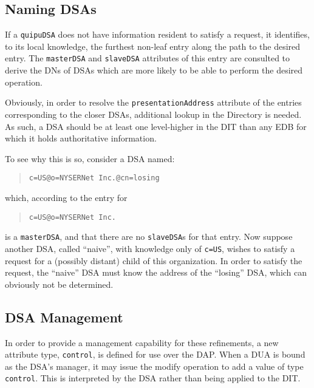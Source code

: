 \subsection	{Naming DSAs}
If a \verb"quipuDSA" does not have information resident to satisfy a request,
it identifies,
to its local knowledge,
the furthest non-leaf entry along the path to the desired entry.
The \verb"masterDSA" and \verb"slaveDSA" attributes of this entry are
consulted to derive the DNs of DSAs which are more likely to be able to
perform the desired operation.

Obviously,
in order to resolve the \verb"presentationAddress" attribute of the entries
corresponding to the closer DSAs,
additional lookup in the Directory is needed.
As such,
a DSA should be at least one level-higher in the DIT than any EDB for which it
holds authoritative information.

To see why this is so,
consider a DSA named:
\begin{quote}\small\begin{verbatim}
c=US@o=NYSERNet Inc.@cn=losing
\end{verbatim}\end{quote}
which,
according to the entry for
\begin{quote}\small\begin{verbatim}
c=US@o=NYSERNet Inc.
\end{verbatim}\end{quote}
is a \verb"masterDSA",
and that there are no \verb"slaveDSA"s for that entry.
Now suppose another DSA,
called ``naive'',
with knowledge only of \verb"c=US",
wishes to satisfy a request for a (possibly distant) child of this
organization.
In order to satisfy the request,
the ``naive'' DSA must know the address of the ``losing'' DSA,
which can obviously not be determined.

\subsection	{DSA Management}
In order to provide a management capability for these refinements,
a new attribute type, \verb"control", is defined for use over the DAP.
When a DUA is bound as the DSA's manager,
it may issue the modify operation to add a value of type \verb"control".
This is interpreted by the DSA rather than being applied to the DIT.

